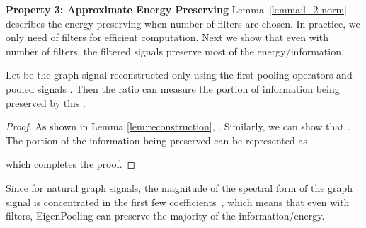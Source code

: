 \documentclass[sigconf]{acmart}
\begin{document}
\vspace{0.5em}
\noindent{}\textbf{Property 3: Approximate Energy Preserving} Lemma~\ref{lemma:l_2 norm} describes the energy preserving when  number of filters are chosen. In practice, we only need  of filters for efficient computation. Next we show that even with  number of filters, the filtered signals preserve most of the energy/information.
\begin{theorem}
Let  be the graph signal reconstructed only using the first  pooling operators and pooled signals . Then the ratio  can measure the portion of information being preserved by this . 
\label{thm:energy_preserving_global}
\end{theorem}
\vspace{-1em}
\begin{proof}
As shown in Lemma \ref{lem:reconstruction}, . Similarly, we can show that . The portion of the information being preserved can be represented as 

which completes the proof.
\end{proof}
Since for natural graph signals, the magnitude of the spectral form of the graph signal is concentrated in the first few coefficients~\cite{sandryhaila2013discrete}, which means that even with  filters, EigenPooling can preserve the majority of the information/energy.
\end{document}
